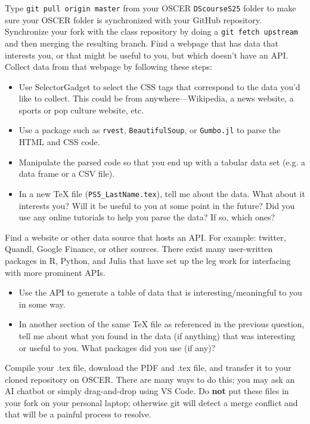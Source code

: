 \documentclass[12pt,english]{exam}
\begin{document}
\begin{questions}
\question Type \texttt{git pull origin master} from your OSCER \texttt{DScourseS25} folder to make sure your OSCER folder is synchronized with your GitHub repository. 
\question Synchronize your fork with the class repository by doing a \texttt{git fetch upstream} and then merging the resulting branch. 
\question Find a webpage that has data that interests you, or that might be useful to you, but which doesn't have an API. Collect data from that webpage by following these steps:
\begin{itemize}
    \item Use SelectorGadget to select the CSS tags that correspond to the data you'd like to collect. This could be from anywhere---Wikipedia, a news website, a sports or pop culture website, etc.
    \item Use a package such as \texttt{rvest}, \texttt{BeautifulSoup}, or \texttt{Gumbo.jl} to parse the HTML and CSS code.
    \item Manipulate the parsed code so that you end up with a tabular data set (e.g. a data frame or a CSV file).
    \item In a new TeX file (\texttt{PS5\_LastName.tex}), tell me about the data. What about it interests you? Will it be useful to you at some point in the future? Did you use any online tutorials to help you parse the data? If so, which ones?
\end{itemize}
\question Find a website or other data source that hosts an API. For example: twitter, Quandl, Google Finance, or other sources. There exist many user-written packages in R, Python, and Julia that have set up the leg work for interfacing with more prominent APIs. 
\begin{itemize}
    \item Use the API to generate a table of data that is interesting/meaningful to you in some way.
    \item In another section of the same TeX file as referenced in the previous question, tell me about what you found in the data (if anything) that was interesting or useful to you. What packages did you use (if any)?
\end{itemize}
\question Compile your .tex file, download the PDF and .tex file, and transfer it to your cloned repository on OSCER. There are many ways to do this;  you may ask an AI chatbot or simply drag-and-drop using VS Code. Do \textbf{not} put these files in your fork on your personal laptop; otherwise git will detect a merge conflict and that will be a painful process to resolve.

\end{questions}
\end{document}
